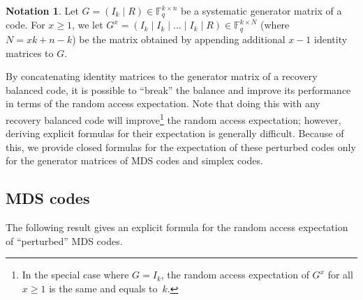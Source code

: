 \documentclass[11pt,a4paper,reqno,twoside]{amsart}
\theoremstyle{definition}
\newtheorem{notation}{Notation}
\newcommand{\F}{\mathbb{F}}
\begin{document}



\begin{notation} \label{not:extmds}
Let $G= (I_k \mid R) \in \F_q^{k \times n}$ be a systematic generator matrix of a code. For $x \ge 1$, we let $G^x = (I_k \mid I_k \mid \dots \mid I_k \mid R) \in \F_q^{k \times N}$ (where $N=xk+n-k$) be the matrix obtained by appending additional $x-1$ identity matrices to $G$. 
\end{notation}

By concatenating identity matrices to the generator matrix of a recovery balanced code, it is possible to ``break'' the balance and improve its performance in terms of the random access expectation. Note that doing this with any recovery balanced code will improve\footnote{In the special case where $G=I_k$, the random access expectation of $G^x$ for all $x\ge 1$ is the same and equals to~$k$.} the random access expectation; however, deriving explicit formulas for their expectation is generally difficult. Because of this, we provide closed formulas for the expectation of these perturbed codes only for the generator matrices of MDS codes and simplex codes.


\subsection{MDS codes}
The following result gives an explicit formula for the random access expectation of ``perturbed'' MDS codes. 
\end{document}
